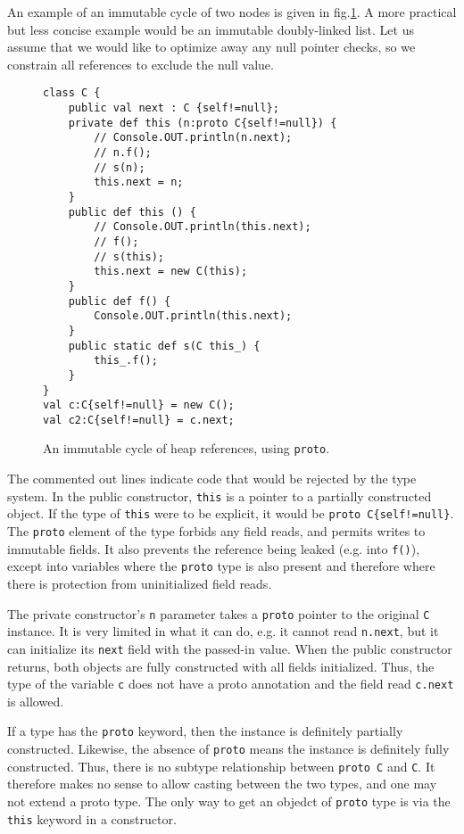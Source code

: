 An example of an immutable cycle of two nodes is given
in fig.\ref{Figure:Cyclic}.  A more practical but less concise example would be
an immutable doubly-linked list.  Let us assume that we would like to optimize
away any null pointer checks, so we constrain all references to exclude the
null value.

\begin{figure}
\begin{lstlisting}
class C {
    public val next : C {self!=null};
    private def this (n:proto C{self!=null}) {
        // Console.OUT.println(n.next);
        // n.f();
        // s(n);
        this.next = n;
    }
    public def this () {
        // Console.OUT.println(this.next);
        // f();
        // s(this);
        this.next = new C(this);
    }
    public def f() {
        Console.OUT.println(this.next);
    }
    public static def s(C this_) {
        this_.f();
    }
}
val c:C{self!=null} = new C();
val c2:C{self!=null} = c.next;
\end{lstlisting}
\caption{An immutable cycle of heap references, using \texttt{proto}.}
\label{Figure:Cyclic}
\end{figure}

The commented out lines indicate code that would be rejected by the type
system.  In the public constructor, \texttt{this} is a pointer to a partially
constructed object.  If the type of \texttt{this} were to be explicit, it would
be \texttt{proto C\{self!=null\}}.  The \texttt{proto} element of the type
forbids any field reads, and permits writes to immutable fields.  It also
prevents the reference being leaked (e.g. into \texttt{f()}), except into
variables where the \texttt{proto} type is also present and therefore where
there is protection from uninitialized field reads.

The private constructor's \texttt{n} parameter takes a \texttt{proto} pointer
to the original \texttt{C} instance.  It is very limited in what it can do,
e.g. it cannot read \texttt{n.next}, but it can initialize its \texttt{next}
field with the passed-in value.  When the public constructor returns, both
objects are fully constructed with all fields initialized.  Thus, the type of
the variable \texttt{c} does not have a proto annotation and the field read
\texttt{c.next} is allowed.

If a type has the \texttt{proto} keyword, then the instance is definitely
partially constructed.  Likewise, the absence of \texttt{proto} means the
instance is definitely fully constructed.  Thus, there is no subtype
relationship between \texttt{proto C} and \texttt{C}.  It therefore makes no
sense to allow casting between the two types, and one may not extend a proto
type.  The only way to get an objedct of \texttt{proto} type is via the
\texttt{this} keyword in a constructor.

